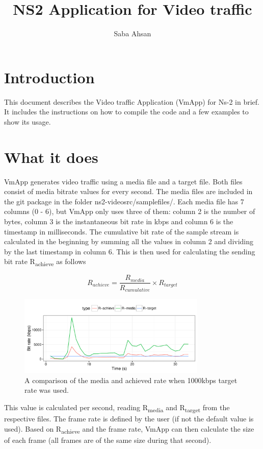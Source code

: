 \documentclass[11pt]{article} %
\title{NS2 Application for Video traffic}
\author{Saba Ahsan}
\begin{document}
\maketitle

\section{Introduction}
This document describes the Video traffic Application (VmApp) for Ns-2 in brief. It includes the instructions on how to compile the code and a few examples to show its usage.

\section{What it does}

VmApp generates video traffic using a media file and a target file. Both files consist of media bitrate values for every second. The media files are included in the git package in the folder ns2-videosrc/samplefiles/. Each media file has 7 columns (0 - 6), but VmApp only uses three of them: column 2 is the number of bytes, column 3 is the instantaneous bit rate in kbps and  column 6 is the timestamp in milliseconds. The cumulative bit rate of the sample stream is calculated in the beginning by summing all the values in column 2 and dividing by the last timestamp in column 6. This is then used for calculating the sending bit rate R\textsubscript{achieve} as follows 


\begin{equation}
R_{achieve}= \frac{R_{media}}{R_{cumulative}} \times R_{target}
\end{equation}
\begin{figure}[!ht]
  \centering
    \includegraphics[width=0.8\textwidth]{docfiles/rates.pdf}
  \caption{A comparison of the media and achieved rate when 1000kbps target rate was used.}
\end{figure}

This value is calculated per second, reading R\textsubscript{media} and R\textsubscript{target} from the respective files. The frame rate is defined by the user (if not the default value is used). Based on R\textsubscript{achieve} and the frame rate, VmApp can then calculate the size of each frame (all frames are of the same size during that second).  
\end{document}

